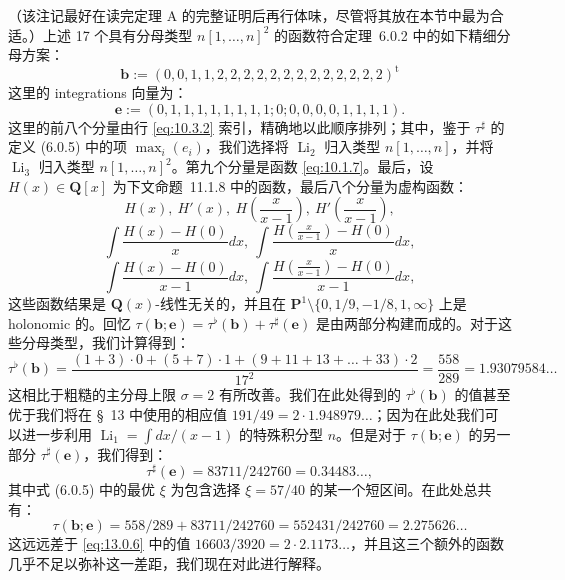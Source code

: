 \setcounter{equation}{2}
\begin{remark}\label{rem:10.3.3}
（该注记最好在读完定理 A 的完整证明后再行体味，尽管将其放在本节中最为合适。）上述 17 个具有分母类型 $n[1, \dots, n]^2$ 的函数符合定理~6.0.2 中的如下精细分母方案：
\[ \mathbf{b} := (0, 0, 1, 1, 2, 2, 2, 2, 2, 2, 2, 2, 2, 2, 2, 2, 2)^{\mathrm{t}} \]
这里的 integrations 向量为：
\[ \mathbf{e} := (0, 1, 1, 1, 1, 1, 1, 1, 1; 0; 0, 0, 0, 0, 1, 1, 1, 1). \]
这里的前八个分量由行 \eqref{eq:10.3.2} 索引，精确地以此顺序排列；其中，鉴于 $\tau^{\sharp}$ 的定义 (6.0.5) 中的项 $\max_i(e_i)$，我们选择将 $\operatorname{Li}_2$ 归入类型 $n[1,\dots,n]$，并将 $\operatorname{Li}_3$ 归入类型 $n[1,\dots,n]^2$。第九个分量是函数 \eqref{eq:10.1.7}。最后，设 $H(x) \in \mathbf{Q}[x]$ 为下文命题~11.1.8 中的函数，最后八个分量为虚构函数：
\[ H(x), \ H'(x), \ H\left(\frac{x}{x-1}\right), \ H'\left(\frac{x}{x-1}\right), \]
\[ \int \frac{H(x) - H(0)}{x} dx, \ \int \frac{H\left(\frac{x}{x-1}\right) - H(0)}{x} dx, \]
\[ \int \frac{H(x) - H(0)}{x-1} dx, \ \int \frac{H\left(\frac{x}{x-1}\right) - H(0)}{x-1} dx, \]
这些函数结果是 $\mathbf{Q}(x)$-线性无关的，并且在 $\mathbf{P}^1 \setminus \{0, 1/9, -1/8, 1, \infty\}$ 上是 holonomic 的。回忆 $\tau(\mathbf{b}; \mathbf{e}) = \tau^\flat(\mathbf{b}) + \tau^\sharp(\mathbf{e})$ 是由两部分构建而成的。对于这些分母类型，我们计算得到：
\[ \tau^{\flat}(\mathbf{b}) = \frac{(1+3)\cdot 0 + (5+7)\cdot 1 + (9+11+13+\dots+33)\cdot 2}{17^2} = \frac{558}{289} = 1.93079584\dots \]
这相比于粗糙的主分母上限 $\sigma = 2$ 有所改善。我们在此处得到的 $\tau^\flat(\mathbf{b})$ 的值甚至优于我们将在 \S~13 中使用的相应值 $191/49 = 2 \cdot 1.948979\dots$；因为在此处我们可以进一步利用 $\operatorname{Li}_1 = \int dx/(x-1)$ 的特殊积分型 $n$。但是对于 $\tau(\mathbf{b}; \mathbf{e})$ 的另一部分 $\tau^\sharp(\mathbf{e})$，我们得到：
\[ \tau^{\sharp}(\mathbf{e}) = 83711/242760 = 0.34483\dots, \]
其中式 (6.0.5) 中的最优 $\xi$ 为包含选择 $\xi = 57/40$ 的某一个短区间。在此处总共有：
\[ \tau(\mathbf{b}; \mathbf{e}) = 558/289 + 83711/242760 = 552431/242760 = 2.275626\dots \]
这远远差于 \eqref{eq:13.0.6} 中的值 $16603/3920 = 2 \cdot 2.1173\dots$，并且这三个额外的函数几乎不足以弥补这一差距，我们现在对此进行解释。


\end{remark}

